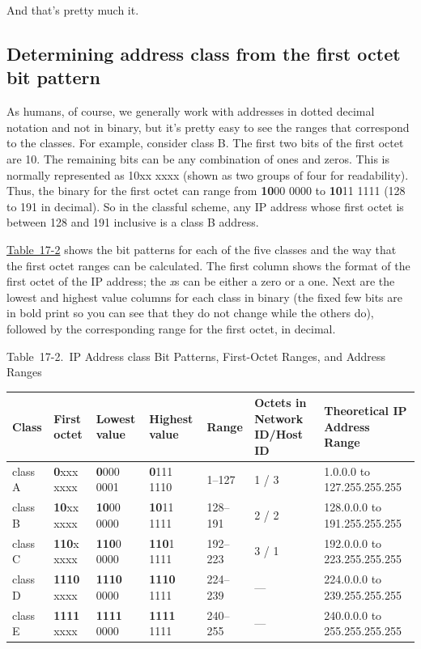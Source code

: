 \documentclass[b5paper,11pt]{memoir}
\begin{document}
And that's pretty much it.



\subsection{Determining address class from the first octet bit pattern}

As humans, of course, we generally work with addresses in dotted decimal
notation and not in binary, but it's pretty easy to see the ranges that
correspond to the classes. For example, consider class B. The first two
bits of the first octet are 10. The remaining bits can be any
combination of ones and zeros. This is normally represented as 10xx xxxx
(shown as two groups of four for readability). Thus, the binary for the
first octet can range from {\textbf{10}}00 0000 to {\textbf{10}}11 1111
(128 to 191 in decimal). So in the classful scheme, any IP address whose
first octet is between 128 and 191 inclusive is a class B address.

\protect\hyperlink{ch17s02.htmlux5cux23ip_address_class_bit_patterns_first-octe}{Table~17-2}
shows the bit patterns for each of the five classes and the way that the first octet
ranges can be calculated. The first column shows the format of the first
octet of the IP address; the {\emph{x}}s can be either a zero or a one.
Next are the lowest and highest value columns for each class in binary
(the fixed few bits are in bold print so you can see that they do not
change while the others do), followed by the corresponding range for the
first octet, in decimal.

\protect\hypertarget{ch17s02.htmlux5cux23ip_address_class_bit_patterns_first-octe}{}{}

Table~17-2.~IP Address class Bit Patterns, First-Octet Ranges, and
Address Ranges

\begin{longtable}[]{@{}lllllll@{}}
\toprule
Class & First octet & Lowest value & Highest value & Range & Octets in Network ID/Host ID & Theoretical IP Address Range\tabularnewline
\midrule
\endhead
class A & \textbf{0}xxx xxxx & {\textbf{0}}000 0001 & {\textbf{0}}111 1110 & 1--127 & 1 / 3 & 1.0.0.0 to 127.255.255.255\\
class B & \textbf{10}xx xxxx & {\textbf{10}}00 0000 & {\textbf{10}}11 1111 & 128--191 & 2 / 2 & 128.0.0.0 to 191.255.255.255\\
class C & \textbf{110}x xxxx & {\textbf{110}}0 0000 & {\textbf{110}}1 1111 & 192--223 & 3 / 1 & 192.0.0.0 to 223.255.255.255\\
class D & \textbf{1110} xxxx & {\textbf{1110}} 0000 & {\textbf{1110}} 1111 & 224--239 & --- & 224.0.0.0 to 239.255.255.255\\
class E & \textbf{1111} xxxx & {\textbf{1111}} 0000 & {\textbf{1111}} 1111 & 240--255 & --- & 240.0.0.0 to 255.255.255.255\\
\bottomrule
\end{longtable}
\end{document}
